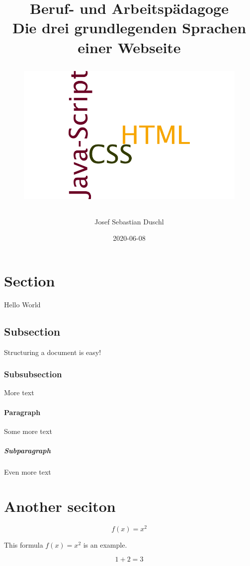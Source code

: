 \documentclass{article}
\title{
	Beruf- und Arbeitspädagoge\\
	Die drei grundlegenden Sprachen einer Webseite
	\newline
	\begin{figure}[h!]
		\vspace{15mm}
	\includegraphics[scale=0.2, width=\linewidth]{./pics/htmlCssJsWordwordle.png}
\end{figure}
	\vfill
}
\author{
	Josef Sebastian Duschl
}
\date{2020-06-08}
\begin{document}


    \maketitle
    \newpage

    \tableofcontents %
    \newpage

    \section{Section}
        Hello World

    \subsection{Subsection}
        Structuring a document is easy!

    \subsubsection{Subsubsection}
        More text

    \paragraph{Paragraph}
        Some more text

    \subparagraph{Subparagraph}
        Even more text

    \section{Another seciton}

\begin{equation*}
    f(x) = x^2
\end{equation*}

This formula $f(x) = x^2$ is an example.

\begin{equation*}
    1 + 2 = 3
\end{equation*}
\end{document}
